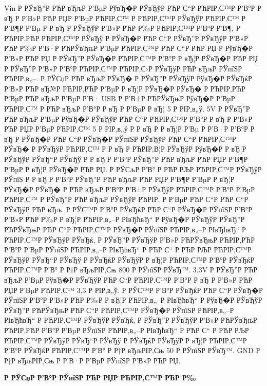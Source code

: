 \documentclass[a4paper,14pt]{extarticle}
\begin{document}
    Vin Р  РЎвЂ”Р РЋР вЂљР  Р’ВµР  РўвЂ�Р  РЎвЂўР РЋР С“Р РЋРІР‚С™Р  Р’В°Р  Р вЂ Р  Р’В»Р РЋР РЏР  Р’ВµР РЋРІР‚С™ Р РЋРІР‚С™Р  РЎвЂўР РЋРІР‚С™ Р  Р’В¶Р  Р’Вµ Р  Р вЂ Р  РЎвЂўР  Р’В»Р РЋР Р‰Р РЋРІР‚С™Р  Р’В°Р  Р’В¶, Р РЋРІР‚РЋР РЋРІР‚С™Р  РЎвЂў Р  РЎвЂ�Р РЋР С“Р  РЎвЂ”Р  РЎвЂўР  Р’В»Р РЋР Р‰Р  Р’В·Р РЋРЎвЂњР  Р’ВµР РЋРІР‚С™Р РЋР С“Р РЋР РЏ Р  РўвЂ�Р  Р’В»Р РЋР РЏ Р  РЎвЂ”Р  РЎвЂ�Р РЋРІР‚С™Р  Р’В°Р  Р вЂ¦Р  РЎвЂ�Р РЋР РЏ Р  РЎвЂ”Р  Р’В»Р  Р’В°Р РЋРІР‚С™Р РЋРІР‚С›Р  РЎвЂўР РЋР вЂљР  РЎпїЅР РЋРІР‚в„–. Р  РЎСџР РЋР вЂљР  РЎвЂ� Р  РЎвЂ”Р  РЎвЂўР  РўвЂ�Р  РЎвЂќР  Р’В»Р РЋР вЂ№Р РЋРІР‚РЋР  Р’ВµР  Р вЂ¦Р  РЎвЂ�Р  РЎвЂ� Р РЋРІР‚РЋР  Р’ВµР РЋР вЂљР  Р’ВµР  Р’В· USB Р  Р’В±Р РЋРЎвЂњР  РўвЂ�Р  Р’ВµР РЋРІР‚С™ Р РЋР вЂљР  Р’В°Р  Р вЂ Р  Р’ВµР  Р вЂ¦ 5 Р  РІР‚в„ў.
    5V Р  РЎвЂ”Р РЋР вЂљР  Р’ВµР  РўвЂ�Р  РЎвЂўР РЋР С“Р РЋРІР‚С™Р  Р’В°Р  Р вЂ Р  Р’В»Р РЋР РЏР  Р’ВµР РЋРІР‚С™ 5 Р  РІР‚в„ў Р  Р вЂ Р  Р вЂ¦Р  Р’Вµ Р  Р’В·Р  Р’В°Р  Р вЂ Р  РЎвЂ�Р РЋР С“Р  РЎвЂ�Р  РЎпїЅР  РЎвЂўР РЋР С“Р РЋРІР‚С™Р  РЎвЂ� Р  РЎвЂўР РЋРІР‚С™ Р  Р вЂ Р РЋРІР‚В¦Р  РЎвЂўР  РўвЂ�Р  Р вЂ¦Р  РЎвЂўР  РЎвЂ“Р  РЎвЂў Р  Р вЂ¦Р  Р’В°Р  РЎвЂ”Р РЋР вЂљР РЋР РЏР  Р’В¶Р  Р’ВµР  Р вЂ¦Р  РЎвЂ�Р РЋР РЏ. Р  РЎСљР  Р’В° Р РЋР РЉР РЋРІР‚С™Р  РЎвЂўР  РЎпїЅ Р  Р вЂ¦Р  Р’В°Р  РЎвЂ”Р РЋР вЂљР РЋР РЏР  Р’В¶Р  Р’ВµР  Р вЂ¦Р  РЎвЂ�Р  РЎвЂ� Р РЋР вЂљР  Р’В°Р  Р’В±Р  РЎвЂўР РЋРІР‚С™Р  Р’В°Р  Р’ВµР РЋРІР‚С™ Р  РЎвЂ”Р РЋР вЂљР  РЎвЂўР РЋРІР‚ Р  Р’ВµР РЋР С“Р РЋР С“Р  РЎвЂўР РЋР вЂљ. Р  РЎС™Р  Р’В°Р  РЎвЂќР РЋР С“Р  РЎвЂ�Р  РЎпїЅР  Р’В°Р  Р’В»Р РЋР Р‰Р  Р вЂ¦Р РЋРІР‚в„–Р  РІвЂћвЂ“ Р  РўвЂ�Р  РЎвЂўР  РЎвЂ”Р РЋРЎвЂњР РЋР С“Р РЋРІР‚С™Р  РЎвЂ�Р  РЎпїЅР РЋРІР‚в„–Р  РІвЂћвЂ“ Р РЋРІР‚С™Р  РЎвЂўР  РЎвЂќ, Р  РЎвЂ”Р  РЎвЂўР  Р’В»Р РЋРЎвЂњР РЋРІР‚РЋР  Р’В°Р  Р’ВµР  РЎпїЅР РЋРІР‚в„–Р  РІвЂћвЂ“ Р РЋР С“ Р РЋР РЉР РЋРІР‚С™Р  РЎвЂўР  РЎвЂ“Р  РЎвЂў Р  РЎвЂќР  РЎвЂўР  Р вЂ¦Р РЋРІР‚С™Р  Р’В°Р  РЎвЂќР РЋРІР‚С™Р  Р’В° Р Р†Р вЂљРІР‚Сњ 800 Р  РЎпїЅР  РЎвЂ™.
    3.3V Р  РЎвЂ”Р РЋР вЂљР  Р’ВµР  РўвЂ�Р  РЎвЂўР РЋР С“Р РЋРІР‚С™Р  Р’В°Р  Р вЂ Р  Р’В»Р РЋР РЏР  Р’ВµР РЋРІР‚С™ 3,3 Р  РІР‚в„ў. Р  РЎС™Р  Р’В°Р  РЎвЂќР РЋР С“Р  РЎвЂ�Р  РЎпїЅР  Р’В°Р  Р’В»Р РЋР Р‰Р  Р вЂ¦Р РЋРІР‚в„–Р  РІвЂћвЂ“ Р  РўвЂ�Р  РЎвЂўР  РЎвЂ”Р РЋРЎвЂњР РЋР С“Р РЋРІР‚С™Р  РЎвЂ�Р  РЎпїЅР РЋРІР‚в„–Р  РІвЂћвЂ“ Р РЋРІР‚С™Р  РЎвЂўР  РЎвЂќ, Р  РЎвЂ”Р  РЎвЂўР  Р’В»Р РЋРЎвЂњР РЋРІР‚РЋР  Р’В°Р  Р’ВµР  РЎпїЅР РЋРІР‚в„–Р  РІвЂћвЂ“ Р РЋР С“ Р РЋР РЉР РЋРІР‚С™Р  РЎвЂўР  РЎвЂ“Р  РЎвЂў Р  РЎвЂќР  РЎвЂўР  Р вЂ¦Р РЋРІР‚С™Р  Р’В°Р  РЎвЂќР РЋРІР‚С™Р  Р’В° Р Р†Р вЂљРІР‚Сњ 50 Р  РЎпїЅР  РЎвЂ™.
    GND Р Р†Р вЂљРІР‚Сњ Р  Р’В·Р  Р’ВµР  РЎпїЅР  Р’В»Р РЋР РЏ.

\centerline{\large \bfseries Р  РЎСџР  Р’В°Р  РЎпїЅР РЋР РЏР РЋРІР‚С™Р РЋР Р‰}
\end{document}
